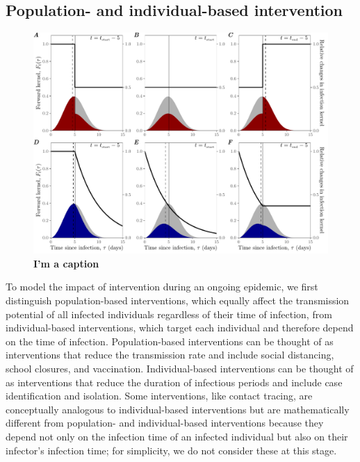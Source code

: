 \documentclass[12pt]{article}
\begin{document}
\subsection{Population- and individual-based intervention}

\begin{figure}[!th]
\includegraphics[width=1\textwidth]{pop_ind_compare.pdf}
\caption{
\textbf{I'm a caption}
}
\label{fig:indpop}
\end{figure}

To model the impact of intervention during an ongoing epidemic, we first distinguish population-based interventions, which equally affect the transmission potential of all infected individuals regardless of their time of infection, from individual-based interventions, which target each individual and therefore depend on the time of infection.
Population-based interventions can be thought of as interventions that reduce the transmission rate and include social distancing, school closures, and vaccination.
Individual-based interventions can be thought of as interventions that reduce the duration of infectious periods and include case identification and isolation.
Some interventions, like contact tracing, are conceptually analogous to individual-based interventions but are mathematically different from population- and individual-based interventions because they depend not only on the infection time of an infected individual but also on their infector's infection time;
for simplicity, we do not consider these at this stage.
\end{document}

